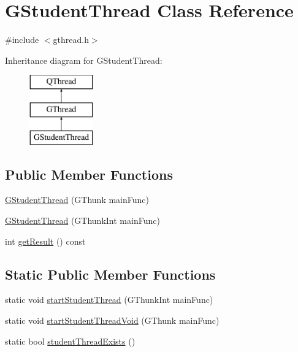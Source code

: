 \hypertarget{classGStudentThread}{}\section{G\+Student\+Thread Class Reference}
\label{classGStudentThread}


{\ttfamily \#include $<$gthread.\+h$>$}

Inheritance diagram for G\+Student\+Thread\+:\begin{figure}[H]
\begin{center}
\leavevmode
\includegraphics[height=3.000000cm]{classGStudentThread}
\end{center}
\end{figure}
\subsection*{Public Member Functions}
\begin{DoxyCompactItemize}
\item 
\mbox{\hyperlink{classGStudentThread_a125901bcd185be5775579e6c10bfc63d}{G\+Student\+Thread}} (G\+Thunk main\+Func)
\item 
\mbox{\hyperlink{classGStudentThread_a64da646ed16e65b114391682c16d0d0d}{G\+Student\+Thread}} (G\+Thunk\+Int main\+Func)
\item 
int \mbox{\hyperlink{classGStudentThread_a5cc8ee3a55ca4615bec4c5ff641d4420}{get\+Result}} () const
\end{DoxyCompactItemize}
\subsection*{Static Public Member Functions}
\begin{DoxyCompactItemize}
\item 
static void \mbox{\hyperlink{classGStudentThread_a7d68a5d8a6557bb824cf2568240a1aef}{start\+Student\+Thread}} (G\+Thunk\+Int main\+Func)
\item 
static void \mbox{\hyperlink{classGStudentThread_a363837074ca4db293a647d8d15d362c1}{start\+Student\+Thread\+Void}} (G\+Thunk main\+Func)
\item 
static bool \mbox{\hyperlink{classGStudentThread_af75b92d7df24cf0e2f06193944b9db32}{student\+Thread\+Exists}} ()
\end{DoxyCompactItemize}
